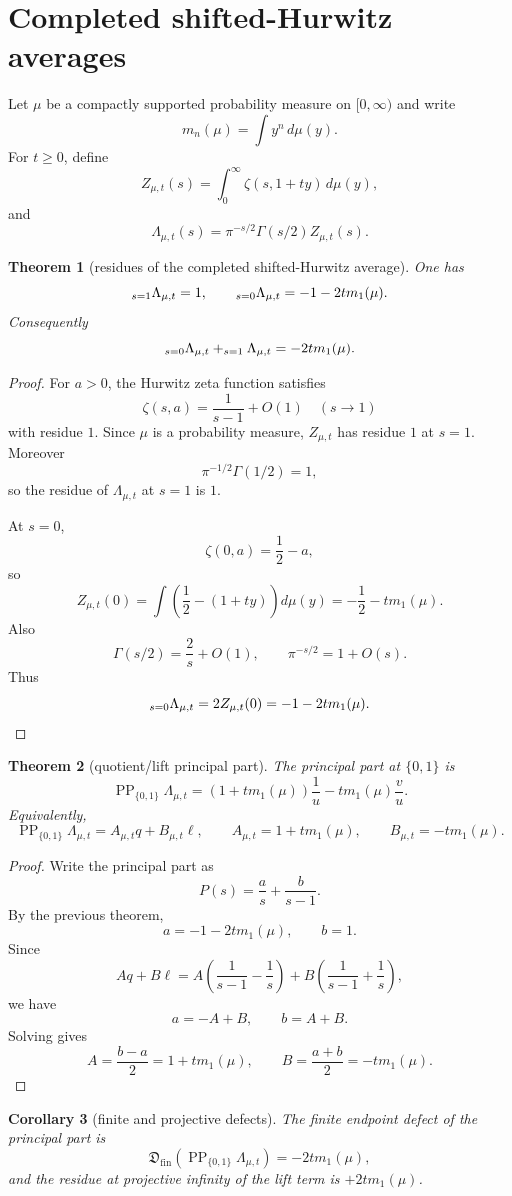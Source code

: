 \documentclass[11pt]{article}
\newtheorem{theorem}{Theorem}[section]
\newtheorem{corollary}[theorem]{Corollary}
\let\Res\relax
\DeclareMathOperator{\Res}{Res}
\newcommand{\PP}{\operatorname{PP}}
\newcommand{\Fin}{\operatorname{fin}}
\begin{document}
\section{Completed shifted-Hurwitz averages}

Let $\mu$ be a compactly supported probability measure on $[0,\infty)$ and write
\[
m_n(\mu)=\int y^n\,d\mu(y).
\]
For $t\ge0$, define
\[
Z_{\mu,t}(s)=\int_0^\infty \zeta(s,1+ty)\,d\mu(y),
\]
and
\[
\Lambda_{\mu,t}(s)=\pi^{-s/2}\Gamma(s/2)Z_{\mu,t}(s).
\]

\begin{theorem}[residues of the completed shifted-Hurwitz average]
One has
\[
\Res_{s=1}\Lambda_{\mu,t}=1,
\qquad
\Res_{s=0}\Lambda_{\mu,t}=-1-2t m_1(\mu).
\]
Consequently
\[
\Res_{s=0}\Lambda_{\mu,t}+\Res_{s=1}\Lambda_{\mu,t}=-2t m_1(\mu).
\]
\end{theorem}

\begin{proof}
For $a>0$, the Hurwitz zeta function satisfies
\[
\zeta(s,a)=\frac1{s-1}+O(1)\quad(s\to1)
\]
with residue $1$.  Since $\mu$ is a probability measure, $Z_{\mu,t}$ has residue $1$
at $s=1$.  Moreover
\[
\pi^{-1/2}\Gamma(1/2)=1,
\]
so the residue of $\Lambda_{\mu,t}$ at $s=1$ is $1$.

At $s=0$,
\[
\zeta(0,a)=\frac12-a,
\]
so
\[
Z_{\mu,t}(0)=\int\left(\frac12-(1+ty)\right)d\mu(y)=-\frac12-tm_1(\mu).
\]
Also
\[
\Gamma(s/2)=\frac2s+O(1),
\qquad
\pi^{-s/2}=1+O(s).
\]
Thus
\[
\Res_{s=0}\Lambda_{\mu,t}=2Z_{\mu,t}(0)=-1-2t m_1(\mu).
\]
\end{proof}

\begin{theorem}[quotient/lift principal part]
The principal part at $\{0,1\}$ is
\[
\PP_{\{0,1\}}\Lambda_{\mu,t}
=(1+t m_1(\mu))\frac1u-tm_1(\mu)\frac vu.
\]
Equivalently,
\[
\PP_{\{0,1\}}\Lambda_{\mu,t}=A_{\mu,t}q+B_{\mu,t}\ell,
\qquad
A_{\mu,t}=1+t m_1(\mu),
\qquad
B_{\mu,t}=-t m_1(\mu).
\]
\end{theorem}

\begin{proof}
Write the principal part as
\[
P(s)=\frac a s+\frac b{s-1}.
\]
By the previous theorem,
\[
a=-1-2t m_1(\mu),
\qquad
b=1.
\]
Since
\[
Aq+B\ell=A\left(\frac1{s-1}-\frac1s\right)+B\left(\frac1{s-1}+\frac1s\right),
\]
we have
\[
a=-A+B,
\qquad
b=A+B.
\]
Solving gives
\[
A=\frac{b-a}{2}=1+t m_1(\mu),
\qquad
B=\frac{a+b}{2}=-t m_1(\mu).
\]
\end{proof}

\begin{corollary}[finite and projective defects]
The finite endpoint defect of the principal part is
\[
\mathfrak D_{\Fin}(\PP_{\{0,1\}}\Lambda_{\mu,t})=-2t m_1(\mu),
\]
and the residue at projective infinity of the lift term is $+2t m_1(\mu)$.
\end{corollary}
\end{document}
